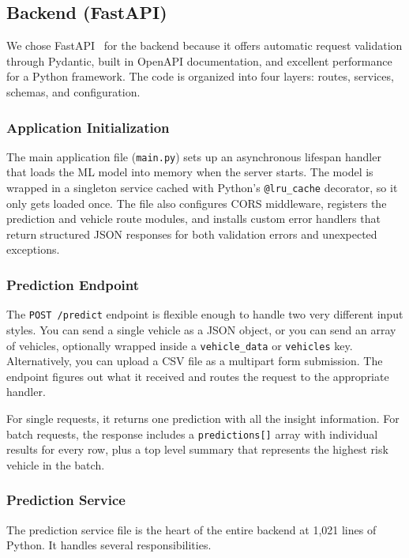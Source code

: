 \documentclass[conference]{IEEEtran}
\begin{document}
\subsection{Backend (FastAPI)}

We chose FastAPI~\cite{fastapi} for the backend because it offers automatic request validation through Pydantic, built in OpenAPI documentation, and excellent performance for a Python framework. The code is organized into four layers: routes, services, schemas, and configuration.

\subsubsection{Application Initialization}
The main application file (\texttt{main.py}) sets up an asynchronous lifespan handler that loads the ML model into memory when the server starts. The model is wrapped in a singleton service cached with Python's \texttt{@lru\_cache} decorator, so it only gets loaded once. The file also configures CORS middleware, registers the prediction and vehicle route modules, and installs custom error handlers that return structured JSON responses for both validation errors and unexpected exceptions.

\subsubsection{Prediction Endpoint}
The \texttt{POST /predict} endpoint is flexible enough to handle two very different input styles. You can send a single vehicle as a JSON object, or you can send an array of vehicles, optionally wrapped inside a \texttt{vehicle\_data} or \texttt{vehicles} key. Alternatively, you can upload a CSV file as a multipart form submission. The endpoint figures out what it received and routes the request to the appropriate handler.

For single requests, it returns one prediction with all the insight information. For batch requests, the response includes a \texttt{predictions[]} array with individual results for every row, plus a top level summary that represents the highest risk vehicle in the batch.

\subsubsection{Prediction Service}
The prediction service file is the heart of the entire backend at 1,021 lines of Python. It handles several responsibilities.
\end{document}
